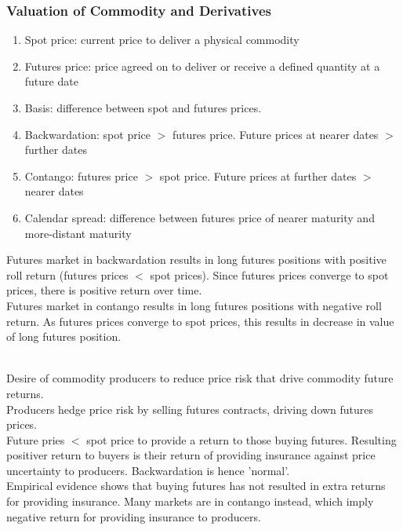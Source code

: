 \subsubsection{Valuation of Commodity and Derivatives}

\begin{remark} 
\begin{enumerate}[label=\roman*.]
\setlength{\itemsep}{0pt}
\item Spot price: current price to deliver a physical commodity
\item Futures price: price agreed on to deliver or receive a defined quantity at a future date
\item Basis: difference between spot and futures prices.
\item Backwardation: spot price $>$ futures price. Future prices at nearer dates $>$ further dates
\item Contango: futures price $>$ spot price. Future prices at further dates $>$ nearer dates
\item Calendar spread: difference between futures price of nearer maturity and more-distant maturity
\end{enumerate}
Futures market in backwardation results in long futures positions with positive roll return (futures prices $<$ spot prices). Since futures prices converge to spot prices, there is positive return over time.\\
Futures market in contango results in long futures positions with negative roll return. As futures prices converge to spot prices, this results in decrease in value of long futures position.
\end{remark}

\begin{remark} \\
Desire of commodity producers to reduce price risk that drive commodity future returns.\\
Producers hedge price risk by selling futures contracts, driving down futures prices.\\
Future pries $<$ spot price to provide a return to those buying futures. Resulting positiver return to buyers is their return of providing insurance against price uncertainty to producers. Backwardation is hence 'normal'.\\
Empirical evidence shows that buying futures has not resulted in extra returns for providing insurance. Many markets are in contango instead, which imply negative return for providing insurance to producers.
\end{remark}

